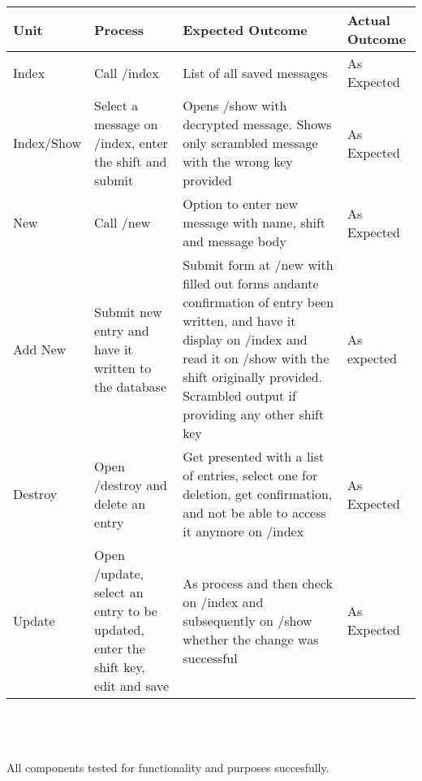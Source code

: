 \documentclass[11pt]{article}
\begin{document}
\begin{tabular}{| p{2cm} | p{4.5cm} | p{4.5cm} | p{4.5cm} |}
Unit              & Process & Expected Outcome & Actual Outcome \\
\hline
Index             & Call /index & List of all saved messages & As Expected \\
Index/Show     & Select a message on /index, enter the shift and submit & Opens /show with decrypted message. Shows only scrambled message with the wrong key provided & As Expected \\
New               & Call /new & Option to enter new message with name, shift and message body & As Expected\\
Add New           & Submit new entry and have it written to the database & Submit form at /new with filled out forms andante confirmation of entry been written, and have it display on /index and read it on /show with the shift originally provided. Scrambled output if providing any other shift key & As expected \\
Destroy           & Open /destroy and delete an entry & Get presented with a list of entries, select one for deletion, get confirmation, and not be able to access it anymore on /index & As Expected \\
Update            & Open /update, select an entry to be updated, enter the shift key, edit and save & As process and then check on /index and subsequently on /show whether the change was successful & As Expected

\end{tabular}
\\\\\\
All components tested for functionality and purposes succesfully.
\end{document}

